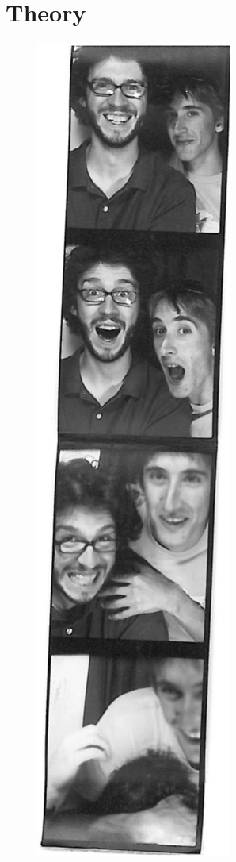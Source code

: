\graphicspath{{Chapters/Theory/Figures/}}
\chapter{Theory}
\label{chap:Theory}

\begin{figure}[htb]
\includegraphics{test2.png}
\end{figure}
